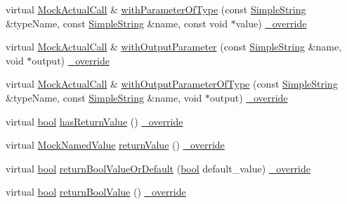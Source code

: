 \begin{DoxyCompactItemize}
\item 
virtual \hyperlink{class_mock_actual_call}{Mock\+Actual\+Call} \& \hyperlink{class_mock_actual_call_trace_a3d0af169b3e41a4ee96e998ac36f7554}{with\+Parameter\+Of\+Type} (const \hyperlink{class_simple_string}{Simple\+String} \&type\+Name, const \hyperlink{class_simple_string}{Simple\+String} \&name, const void $\ast$value) \hyperlink{_cpp_u_test_config_8h_a049bea15dd750e15869863c94c1efc3b}{\+\_\+override}
\item 
virtual \hyperlink{class_mock_actual_call}{Mock\+Actual\+Call} \& \hyperlink{class_mock_actual_call_trace_a37088c117215f5ff1146cc68ec6db6ce}{with\+Output\+Parameter} (const \hyperlink{class_simple_string}{Simple\+String} \&name, void $\ast$output) \hyperlink{_cpp_u_test_config_8h_a049bea15dd750e15869863c94c1efc3b}{\+\_\+override}
\item 
virtual \hyperlink{class_mock_actual_call}{Mock\+Actual\+Call} \& \hyperlink{class_mock_actual_call_trace_a1e67980c8268e97986eeea062301558f}{with\+Output\+Parameter\+Of\+Type} (const \hyperlink{class_simple_string}{Simple\+String} \&type\+Name, const \hyperlink{class_simple_string}{Simple\+String} \&name, void $\ast$output) \hyperlink{_cpp_u_test_config_8h_a049bea15dd750e15869863c94c1efc3b}{\+\_\+override}
\item 
virtual \hyperlink{avb__gptp_8h_af6a258d8f3ee5206d682d799316314b1}{bool} \hyperlink{class_mock_actual_call_trace_afd6d7b809147f4ae665d5b4eb5b08431}{has\+Return\+Value} () \hyperlink{_cpp_u_test_config_8h_a049bea15dd750e15869863c94c1efc3b}{\+\_\+override}
\item 
virtual \hyperlink{class_mock_named_value}{Mock\+Named\+Value} \hyperlink{class_mock_actual_call_trace_a97defb904464d58fdd3e1c8f1d937fc6}{return\+Value} () \hyperlink{_cpp_u_test_config_8h_a049bea15dd750e15869863c94c1efc3b}{\+\_\+override}
\item 
virtual \hyperlink{avb__gptp_8h_af6a258d8f3ee5206d682d799316314b1}{bool} \hyperlink{class_mock_actual_call_trace_a6d855f19ca2a6b781989dfd8343a5926}{return\+Bool\+Value\+Or\+Default} (\hyperlink{avb__gptp_8h_af6a258d8f3ee5206d682d799316314b1}{bool} default\+\_\+value) \hyperlink{_cpp_u_test_config_8h_a049bea15dd750e15869863c94c1efc3b}{\+\_\+override}
\item 
virtual \hyperlink{avb__gptp_8h_af6a258d8f3ee5206d682d799316314b1}{bool} \hyperlink{class_mock_actual_call_trace_ae1dbe3603b0e773c1f34f0dac23513a8}{return\+Bool\+Value} () \hyperlink{_cpp_u_test_config_8h_a049bea15dd750e15869863c94c1efc3b}{\+\_\+override}
\item 

\end{DoxyCompactItemize}
